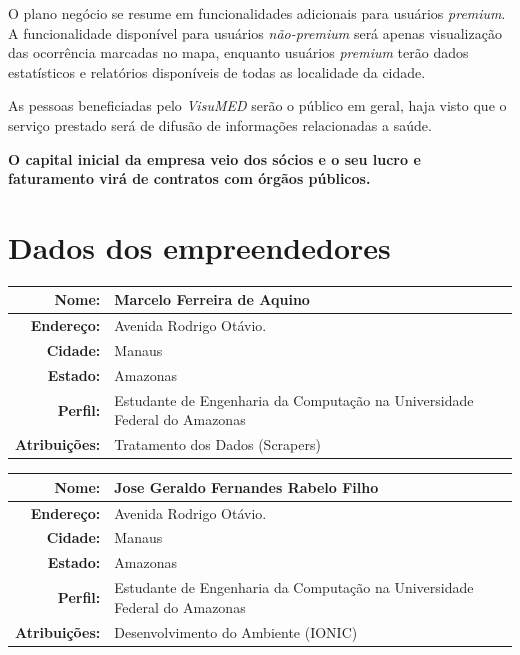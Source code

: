 \documentclass[
	12pt,				%
	openright,			%
	twoside,			%
	a4paper,			%
	english,			%
	french,				%
	spanish,			%
	brazil,				%
	]{abntex2}
\begin{document}
O plano negócio se resume em funcionalidades adicionais para usuários \textit{premium}. A funcionalidade disponível para usuários \textit{não-premium} será apenas visualização das ocorrência marcadas no mapa, enquanto usuários \textit{premium} terão dados  estatísticos e relatórios disponíveis de todas as localidade da cidade.

As pessoas beneficiadas pelo \textit{VisuMED} serão o público em geral, haja visto que o serviço prestado será de difusão de informações relacionadas a saúde. 

\textbf{O capital inicial da empresa veio dos sócios e o seu lucro e faturamento virá de contratos com órgãos públicos.}


\section{Dados dos empreendedores}

\begin{center}
	\begin{tabular}{|r|p{12cm}|}
		\hline
		\textbf{Nome:}		& Marcelo Ferreira de Aquino \\ \hline
		\textbf{Endereço:}	& Avenida Rodrigo Otávio. \\ \hline
		\textbf{Cidade:}	& Manaus \\ \hline
		\textbf{Estado:}	& Amazonas \\ \hline
		\textbf{Perfil:}	& Estudante de Engenharia da Computação na Universidade Federal do Amazonas\\ \hline
		\textbf{Atribuições:}	& Tratamento dos Dados (Scrapers) \\ \hline
	\end{tabular}
\end{center}

\begin{center}
	\begin{tabular}{|r|p{12cm}|}
		\hline
		\textbf{Nome:}		& Jose Geraldo Fernandes Rabelo Filho \\ \hline
		\textbf{Endereço:}	& Avenida Rodrigo Otávio. \\ \hline
		\textbf{Cidade:}	& Manaus \\ \hline
		\textbf{Estado:}	& Amazonas \\ \hline
		\textbf{Perfil:}	& Estudante de Engenharia da Computação na Universidade Federal do Amazonas\\ \hline
		\textbf{Atribuições:}	& Desenvolvimento do Ambiente (IONIC) \\ \hline
	\end{tabular}
\end{center}
\end{document}
